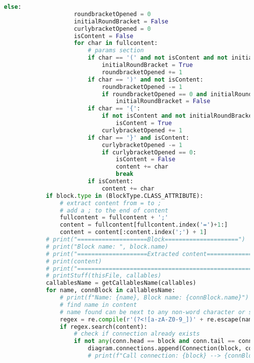 \begin{lstlisting}[language=Python, caption={$\texttt{CallAnalyzer}$ function.}, label={lst:11}]
                else:
                    roundbracketOpened = 0
                    initialRoundBracket = False
                    curlybracketOpened = 0
                    isContent = False
                    for char in fullcontent:
                        # params section
                        if char == '(' and not isContent and not initialRoundBracket:
                            initialRoundBracket = True
                            roundbracketOpened += 1
                        if char == ')' and not isContent:
                            roundbracketOpened -= 1
                            if roundbracketOpened == 0 and initialRoundBracket:
                                initialRoundBracket = False
                        if char == '{':
                            if not isContent and not initialRoundBracket:
                                isContent = True
                            curlybracketOpened += 1
                        if char == '}' and isContent:
                            curlybracketOpened -= 1
                            if curlybracketOpened == 0:
                                isContent = False
                                content += char
                                break
                        if isContent:
                            content += char
            if block.type in (BlockType.CLASS_ATTRIBUTE):
                # extract content from = to ;
                # add a ; to the end of content
                fullcontent = fullcontent + ';'
                content = fullcontent[fullcontent.index('=')+1:]
                content = content[:content.index(';') + 1]
            # print("====================Block=====================")
            # print("Block name: ", block.name)
            # print("====================Extracted content=====================")
            # print(content)
            # print("==========================================================")
            # printStuff(thisFile, callables)
            callablesName = getCallablesName(callables)
            for name, connBlock in callablesName:
                # print(f"Name: {name}, Block name: {connBlock.name}")
                # find name in content
                # name found can be next to any non-word character or start of line and end of line
                regex = re.compile(r'(?<![a-zA-Z0-9_])' + re.escape(name) + r'(?![a-zA-Z0-9_])')
                if regex.search(content):
                    # check if connection already exists
                    if not any(conn.head == block and conn.tail == connBlock and conn.type == ConnectionType.CALL for conn in diagram.connections):
                        diagram.connections.append(Connection(block, connBlock, ConnectionType.CALL))
                        # print(f"Call connection: {block} --> {connBlock}")
\end{lstlisting}

